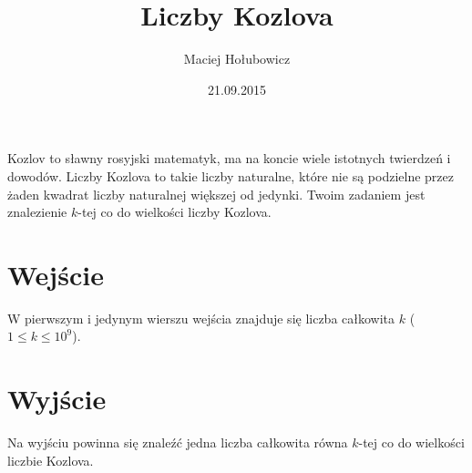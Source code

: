 \documentclass[zad,zawodnik,utf8]{sinol}
\title{Liczby Kozlova}
\author{Maciej Hołubowicz} %
\date{21.09.2015}
\begin{document}
\begin{tasktext}%

Kozlov to sławny rosyjski matematyk, ma na koncie wiele istotnych twierdzeń i dowodów.
Liczby Kozlova to takie liczby naturalne, które nie są podzielne przez żaden kwadrat liczby naturalnej większej od jedynki.
Twoim zadaniem jest znalezienie $k$-tej co do wielkości liczby Kozlova.


  \section{Wejście}
W pierwszym i jedynym wierszu wejścia znajduje się liczba całkowita $k$ ($1 \leq k \leq 10^9 $).

  \section{Wyjście}
Na wyjściu powinna się znaleźć jedna liczba całkowita równa $k$-tej co do wielkości liczbie Kozlova.

\makecompactexample

\end{tasktext}
\end{document}
